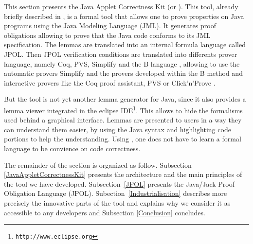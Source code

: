   This section presents the Java Applet Correctness Kit
 (or \JACK).  This tool, already briefly described in
 \cite{BR-gdc2002,BRL-JACK}, is a formal tool that allows one to prove properties on
 Java programs using the Java Modeling Language \cite{Leavens-Baker-Ruby03} (JML).
 It generates proof obligations
 allowing to prove that the Java code conforms to its JML
 specification.  The lemmas are translated into an internal formula language called JPOL. Then JPOL verification conditions are translated into differents prover language, namely Coq, PVS, Simplify and the B language \cite{bbook},
 allowing to use the automatic provers Simplify and the provers developed within the B method and interactive provers like the Coq proof assistant, PVS or Click'n'Prove .

 But the tool is not yet another lemma generator for Java, since it also provides a lemma
 viewer integrated in the eclipse
 IDE\footnote{\texttt{http://www.eclipse.org}}.  This allows to
 hide the formalisms used behind a graphical interface.  Lemmas are
 presented to users in a way they can understand them easier, by using the Java syntax and highlighting code portions to help
 the understanding. Using \JACK, one does not have to learn a formal language to be convience on
code correctness.

 The remainder of the section is organized as follow.  Subsection \ref{JavaAppletCorrectnessKit} presents the
 architecture and the main principles of the tool we have
 developed.
Subsection~\ref{JPOL} presents the Java/Jack Proof Obligation Language (JPOL).
Subection~\ref{Industrialisation} describes more precisely
 the innovative parts of the tool and explains why we consider it as
 accessible to any developers and Subsection \ref{Conclusion} concludes.
